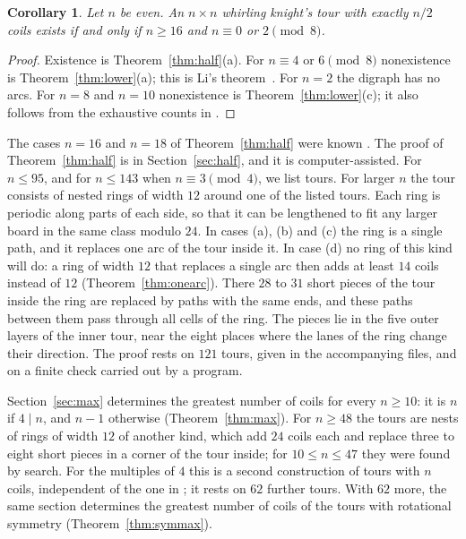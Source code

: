 \documentclass[11pt]{amsart}
\newtheorem{corollary}[theorem]{Corollary}
\theoremstyle{remark}
\begin{document}
\begin{corollary}\label{cor:half}
Let $n$ be even. An $n\times n$ whirling knight's tour with exactly $n/2$ coils exists if and only if $n\ge16$ and
$n\equiv0$ or $2\pmod 8$.
\end{corollary}
\begin{proof}
Existence is Theorem~\ref{thm:half}(a). For $n\equiv4$ or $6\pmod 8$ nonexistence is Theorem~\ref{thm:lower}(a); this
is Li's theorem~\cite{li}. For $n=2$ the digraph has no arcs. For $n=8$ and $n=10$ nonexistence is
Theorem~\ref{thm:lower}(c); it also follows from the exhaustive counts in \cite[answer 229]{knuth}.
\end{proof}
The cases $n=16$ and $n=18$ of Theorem~\ref{thm:half} were known \cite[answer 231]{knuth}. The proof of
Theorem~\ref{thm:half} is in Section~\ref{sec:half}, and it is computer-assisted. For $n\le95$, and for $n\le143$
when $n\equiv3\pmod 4$, we list tours. For larger $n$ the tour consists of nested rings of width $12$ around one of
the listed tours. Each ring is periodic along parts of each side, so that it can be lengthened to fit any larger
board in the same class modulo $24$. In cases (a), (b) and (c) the ring is a single path, and it replaces one arc of
the tour inside it. In case (d) no ring of this kind will do: a ring of width $12$ that replaces a single arc then
adds at least $14$ coils instead of $12$ (Theorem~\ref{thm:onearc}). There $28$ to $31$ short pieces of the
tour inside the ring are replaced by paths with the same ends, and these paths between them pass through all cells
of the ring. The pieces lie in the five outer layers of the inner tour, near the eight places where the lanes of the
ring change their direction. The proof rests on $121$ tours,
given in the accompanying files, and on a finite check carried out by a program.

Section~\ref{sec:max} determines the greatest number of coils for every $n\ge10$: it is $n$ if $4\mid n$, and $n-1$
otherwise (Theorem~\ref{thm:max}). For $n\ge48$ the tours are nests of rings of width $12$ of another kind, which
add $24$ coils each and replace three to eight short pieces in a corner of the tour inside; for $10\le n\le47$ they
were found by search. For the multiples of $4$ this is a
second construction of tours with $n$ coils, independent of the one in \cite[answer 232]{knuth}; it rests on $62$
further tours. With $62$ more, the same section determines the greatest number of coils of the tours with
rotational symmetry (Theorem~\ref{thm:symmax}).
\end{document}
